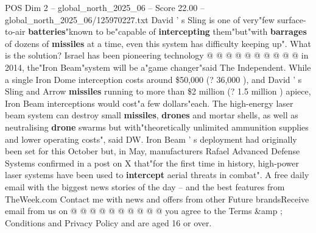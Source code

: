 \begin{textsample}{POS Dim 2 – global\_north\_2025\_06 – Score 22.00 – global\_north\_2025\_06/125970227.txt}
David ' s Sling is one of very"few surface-to-air \textbf{batteries}"known to be"capable of \textbf{intercepting} them"but"with \textbf{barrages} of dozens of \textbf{missiles} at a time, even this system has difficulty keeping up".
What is the solution?
Israel has been pioneering technology @ @ @ @ @ @ @ @ @ @ in 2014, the"Iron Beam"system will be a"game changer"said The Independent.
While a single Iron Dome interception costs around \$50,000 (? 36,000 ), and David ' s Sling and Arrow \textbf{missiles} running to more than \$2 million (? 1.5 million ) apiece, Iron Beam interceptions would cost"a few dollars"each.
The high-energy laser beam system can destroy small \textbf{missiles}, \textbf{drones} and mortar shells, as well as neutralising \textbf{drone} swarms but with"theoretically unlimited ammunition supplies and lower operating costs", said DW.
Iron Beam ' s deployment had originally been set for this October but, in May, manufacturers Rafael Advanced Defense Systems confirmed in a post on X that"for the first time in history, high-power laser systems have been used to \textbf{intercept} aerial threats in combat".
A free daily email with the biggest news stories of the day -- and the best features from TheWeek.com Contact me with news and offers from other Future brandsReceive email from us on @ @ @ @ @ @ @ @ @ @ you agree to the Terms \&amp ; Conditions and Privacy Policy and are aged 16 or over.

\end{textsample}
